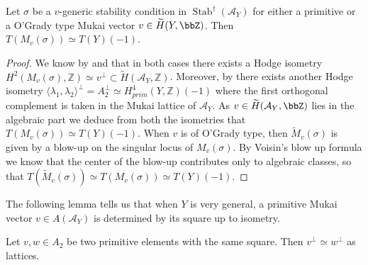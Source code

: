 \documentclass{amsart}
\DeclareMathOperator{\Stab}{Stab}
\begin{document}
\begin{lemma}\label{trascendente_Kuz}
    Let $\sigma$ be a $v$-generic stability condition in $\Stab^{\dagger}(\mathcal{A}_Y)$ for either a primitive or a O'Grady type Mukai vector $v\in\widetilde{H}(Y,\bbZ)$. Then $T(M_v(\sigma))\simeq T(Y) (-1)$.
\end{lemma}
\begin{proof}
    We know by \cite[Proposition 2.8]{GGO} and \cite[Theorem 1.6]{BLMNPS} that in both cases there exists a Hodge isometry $H^2(M_v(\sigma), \mathbb{Z})\simeq
    v^{\perp}\subset \widetilde{H}(\mathcal{A}_Y, \mathbb{Z})$. Moreover, by \cite[Proposition 2.8]{AT} there exists another Hodge isometry $\langle\lambda_1,\lambda_2\rangle^\perp=
    A_2^{\perp}\simeq H^4_{prim}(Y, \mathbb{Z})(-1)$ where the first orthogonal complement is taken in the Mukai lattice of $\mathcal{A}_Y$. As $v\in\widetilde{H}(\mathcal{A}_Y, \bbZ)$ lies in the algebraic part we deduce from both the isometries that $T(M_v(\sigma))\simeq T(Y)(-1)$. When \(v\) is of O'Grady type, then $\widetilde{M}_v(\sigma)$ is given by a blow-up on the singular locus of \(M_v(\sigma)\). By Voisin's blow up formula \cite[Theorem 7.31]{VoisinHodgeTheoryI} we know that the center of the blow-up contributes only to algebraic classes, so that $T(\widetilde{M}_v(\sigma))\simeq T(M_v(\sigma))\simeq T(Y)(-1)$.
\end{proof}
The following lemma tells us that when \(Y\) is very general, a primitive Mukai vector \(v\in A(\mathcal{A}_Y)\) is determined by its square up to isometry.
\begin{lemma}\label{lemma:diofanteo}
    Let $v, w\in A_2$ be two primitive elements with the same square. Then $v^{\perp}\simeq w^{\perp}$ as lattices.
\end{lemma}
\end{document}
